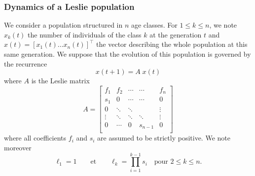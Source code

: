 \subsubsection{Dynamics of a Leslie population}


We consider a population structured in $n$ age classes. For $1 \leq k \leq n$, we note $x_k(t)$ the number of individuals of the class $k$ at the generation $t$ and $x(t) = [x_1(t) \dots x_n(t)]^\top$ the vector describing the whole population at this same generation. We suppose that the evolution of this population is governed by the recurrence
\begin{equation} \label{eq:recurrenceLeslie}
  x(t+1) = A \; x(t)
\end{equation}
where $A$ is the Leslie matrix
$$
A = \left[\begin{array}{cccccc}
            f_1 & f_2 & \cdots  & \cdots & f_n \\
            s_1 & 0 & \cdots  & \cdots & 0 \\
            0 & \ddots  & \ddots & & \vdots \\
            \vdots & \ddots & \ddots & \ddots & \vdots \\
            0 & \cdots & 0 & s_{n-1} & 0 \\
          \end{array}\right]
$$
where all coefficients $f_i$ and $s_i$ are assumed to be strictly positive. We note moreover
$$
\ell_1 = 1 \qquad \text{et} \qquad 
\ell_k = \prod_{i=1}^{k-1} s_i \quad \text{pour $2 \leq k \leq n$}.
$$

